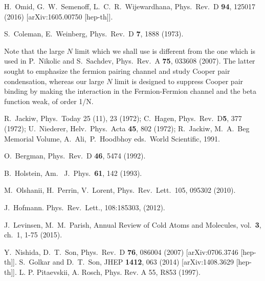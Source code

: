 \documentclass[twocolumn,secnumarabic,amssymb, nobibnotes, aps, prd]{revtex4}
\begin{document}
\begin{thebibliography}{99}
 
  H.\ Omid, G.\ W.\ Semenoff, L.\ C.\ R.\ Wijewardhana,
  Phys.\ Rev.\ D {\bf 94}, 125017 (2016)
  [arXiv:1605.00750 [hep-th]].
  
S.~Coleman, E.~Weinberg, 
Phys.\ Rev.\ D {\bf 7}, 1888 (1973).


  
 Note that the large $N$ limit which we shall use is different from
 the one which is used in P.\ Nikolic and S.\ Sachdev, Phys.\ Rev.\ A
{\bf 75}, 033608 (2007).  The latter sought to emphasize the fermion pairing channel and
study Cooper pair condensation, whereas our large $N$ limit is designed to suppress Cooper
pair binding by making the interaction in the Fermion-Fermion channel and the beta function weak,
of order 1/N. 
  
 
 R.\ Jackiw, Phys.\ Today 25 (11), 23 (1972); 
C.\ Hagen, Phys.\ Rev.\ D{\bf 5}, 377 (1972);
U.\ Niederer, Helv.\ Phys.\ Acta {\bf 45}, 802 (1972);
 R.\ Jackiw, M.\ A.\ Beg Memorial Volume, A.\ Ali,\ P.\ Hoodbhoy eds.\ World Scientific, 1991.

  O.~Bergman,
  Phys.\ Rev.\ D {\bf 46}, 5474 (1992).
 
 B.~Holstein, Am.~ J.~Phys.~{\bf 61}, 142 (1993).

M.~Olshanii, H.~Perrin, V.~Lorent, Phys.\ Rev.\ Lett.\ 105, 095302 (2010).

J.~Hofmann. Phys.\ Rev.\ Lett., 108:185303, (2012).

J.~Levinsen, M.~M.~Parish, 
Annual Review of Cold Atoms and Molecules, vol.~{\bf 3}, ch.~1, 1-75 (2015).

  Y.\ Nishida,  D.\ T.\ Son,
  Phys.\ Rev.\ D {\bf 76}, 086004 (2007)
  [arXiv:0706.3746 [hep-th]].
  S.~Golkar and D.~T.~Son,
  JHEP {\bf 1412}, 063 (2014)
  [arXiv:1408.3629 [hep-th]].
  L. P. Pitaevskii,  A. Rosch, Phys. Rev. A 55, R853
(1997).
 



\end{thebibliography}
\end{document}
